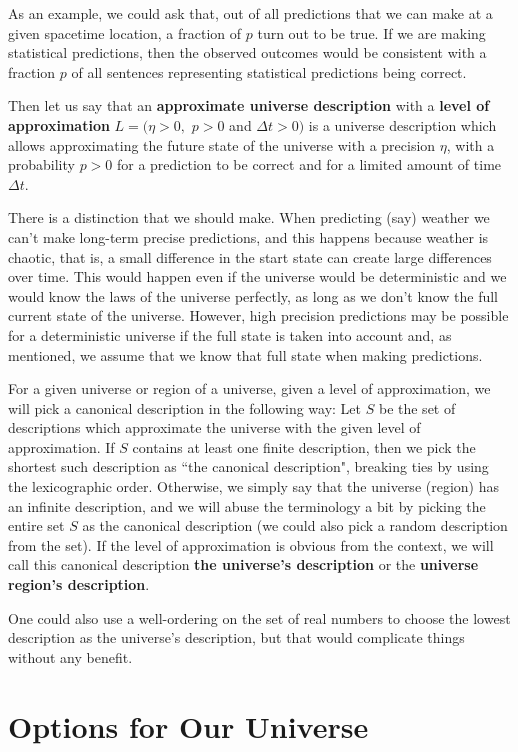 \documentclass[a4paper
,draft
]{article}
\newcommand{\definitie}[1]{\textbf{#1}}
\newcommand{\ghilimele}[1]{``#1"}
\begin{document}
As an example, we could ask that, out of all predictions that we can make
at a given spacetime location, a fraction of $p$ turn out to be true.
If we are making
statistical predictions, then the observed outcomes would be consistent
with a fraction $p$ of all sentences representing statistical predictions
being correct.

Then let us say that an \definitie{approximate universe description} with a
\definitie{level of approximation} $L=(\eta>0,$ $p>0$ and $\Delta t>0)$
is a universe description which allows approximating the future
state of the universe with a precision $\eta$, with a probability
$p>0$ for a prediction to be correct
and for a limited amount of time $\Delta t$.

There is a distinction that we should make.
When predicting (say) weather we can't make long-term precise predictions,
and this happens because weather is chaotic, that is, a small difference
in the start state can create large differences over time.
This would happen even if the universe would be deterministic
and we would know the laws of the universe perfectly, as long as we don't know
the full current state of the universe.
However, high precision predictions may be possible for a deterministic
universe if the full state
is taken into account and, as mentioned, we assume that we know that full
state when making predictions.

For a given universe or region of a universe,
given a level of approximation, we will pick a canonical description
in the following way: Let $S$ be the set of descriptions which approximate
the universe with the given level of approximation. If $S$ contains
at least one finite description, then we pick the shortest such
description as \ghilimele{the canonical description}, breaking ties by
using the lexicographic order. Otherwise, we simply say that the
universe (region) has an infinite description, and we will abuse the
terminology a bit by picking the entire set
$S$ as the canonical description (we could
also pick a random description from the set).
If the level of approximation is obvious from the context, we will call
this canonical description \definitie{the universe's description}
or the \definitie{universe region's description}.

One could also use a well-ordering on the set of real numbers to choose the
lowest description as the universe's description, but that would
complicate things without any benefit.

\section{Options for Our Universe}
\label{sec:options}
\end{document}
